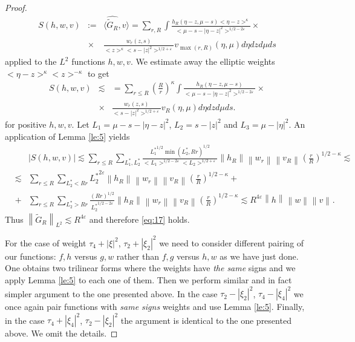 \documentclass[draft,11pt,leqno]{amsart}
\newcommand{\norm}[2]{{\left\| #1 \right\|}_{#2}}
\newcommand{\ve}{\varepsilon}
\newcommand{\ka}{\kappa}
\newcommand{\suml}{\sum\limits}
\newcommand{\f}{\displaystyle\frac}
\newcommand{\dpr}[2]{\langle #1, #2\rangle}
\newcommand{\lone}{{L_1^{*}}}
\newcommand{\ltwo}{{L_2^{*}}}
\begin{document}
\begin{proof}
\begin{eqnarray}
\label{eq:2317}
S(h,w,v)&:=& \dpr{\widehat{\tilde{G}_R}}{v}=\suml_{r, R} \int 
\f{h_R(\eta-z,\mu-s)<\eta-z>^{\ka}}
{<\mu-s-|\eta-z|^2>^{1/2-2\ve}}\times \\
\nonumber
&\times& \f{w_r(z,s)}{<z>^{\ka}
<s-|z|^2>^{1/2+\ve}} v_{\max(r,R)}(\eta,\mu)d\eta dz
d\mu ds
\end{eqnarray}
applied to the $L^2$ functions $h,w,v$. We estimate away the elliptic
 weights $<\eta-z>^{\ka}<z>^{-\ka}$ to get 
\begin{eqnarray*}
S(h,w,v)&\lesssim &=\suml_{r\leq R}
\left(\f{R}{r}\right)^{\ka} \int 
\f{h_R(\eta-z,\mu-s)}
{<\mu-s-|\eta-z|^2>^{1/2-2\ve}}\times \\
&\times& \f{w_r(z,s)}
{<s-|z|^2>^{1/2+\ve}} v_R(\eta,\mu)d\eta dz
d\mu ds.
\end{eqnarray*}
for positive $h, w, v$. 
Let  $L_1=\mu-s-|\eta-z|^2$, $L_2=s-|z|^2$ and $L_3=\mu-|\eta|^2$.
An application  of Lemma \ref{le:5}  yields
\begin{eqnarray*}
& &|S(h,w,v)| \lesssim \suml_{r\leq R}\suml_{\lone,\ltwo}
\f{\lone^{1/2}\min(\ltwo,Rr)^{1/2}}{<L_1>^{1/2-2\ve}<L_2>^{1/2+\ve}}
\norm{h_R}{}\norm{w_r}{}\norm{v_R}{}\left(\f{r}{R}\right)^{1/2-\ka}\lesssim\\
&\lesssim& \suml_{r\leq R}\suml_{\ltwo<Rr}\ltwo^{2\ve}
\norm{h_R}{}\norm{w_r}{}\norm{v_R}{}
\left(\f{r}{R}\right)^{1/2-\ka}+ \\
&+& \suml_{r\leq R}\suml_{\ltwo>Rr} \f{(Rr)^{1/2}}{\ltwo^{1/2-2\ve}}
\norm{h_R}{}\norm{w_r}{}\norm{v_R}{}
\left(\f{r}{R}\right)^{1/2-\ka}\lesssim
R^{4\ve} \norm{h}{}\norm{w}{}\norm{v}{}.
\end{eqnarray*}
Thus $\norm{\tilde{G}_R}{L^2}\lesssim R^{4\ve}$ and therefore \eqref{eq:17} holds.

For the  case of weight $\tau_4+|\xi|^2$, $\tau_2+|\xi_2|^2$ we need to consider 
different  pairing of our functions: $f ,h$ versus $g, w$ rather 
than $f, g$ versus $h, w$ as we have just done. One obtains two trilinear 
forms where the weights have {\it the same} signs and we apply Lemma 
\ref{le:5} to each one of them. 
Then we  perform similar and in fact simpler argument to the one 
presented above. 
In the case $\tau_2-|\xi_2|^2$,  $\tau_4-|\xi_4|^2$
we once again pair functions with {\it same signs} 
weights   and use Lemma \ref{le:5}. 
Finally, in the case $\tau_4+|\xi_4|^2$, $\tau_2-|\xi_2|^2$  the argument is 
identical to the one presented above. We omit the details.
\end{proof}
\end{document}
